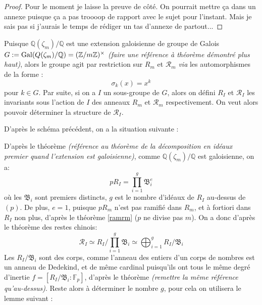 \documentclass[a4paper]{article} %
\numberwithin{equation}{section}
\newcommand\zmodn[1]{\mathbb{Z}/#1\mathbb{Z}}
\begin{document}
\begin{proof}
Pour le moment je laisse la preuve de côté. On pourrait mettre ça dans un annexe puisque ça a pas troooop de rapport avec le sujet pour l'instant. Mais je sais pas si j'aurais le temps de rédiger un tas d'annexe de partout...
\end{proof}

Puisque $\mathbb{Q}(\zeta_m)/\mathbb{Q}$ est une extension galoisienne de groupe de Galois $G := \textup{Gal}(Q(\zeta_m)/\mathbb{Q}) = (\zmodn{m})^{\times}$ \textit{(faire une référence à théorème démontré plus haut)}, alors le groupe agit par restriction sur $R_m$ et $\mathcal{R}_m$ \textit{via} les automorphismes de la forme :
\[\sigma_k(x) = x^k\]
pour $k\in G$. Par suite, si on a $I$ un sous-groupe de $G$, alors on défini $R_I$ et $\mathcal{R}_I$ les invariants sous l'action de $I$ des anneaux $R_m$ et $\mathcal{R}_m$ respectivement. On veut alors pouvoir déterminer la structure de $\mathcal{R}_I$.\par
D'après le schéma précédent, on a la situation suivante :

\begin{center}
\end{center}

D'après le théorème \textit{(référence au théorème de la décomposition en idéaux premier quand l'extension est galoisienne)}, comme $\mathbb{Q}(\zeta_m)/\mathbb{Q}$ est galoisienne, on a:
\[pR_I = \prod_{i = 1}^g{\mathfrak{B}_i^e}\]
où les $\mathfrak{B}_i$ sont premiers distincts, $g$ est le nombre d'idéaux de $R_I$ au-dessus de $(p)$. De plus, $e = 1$, puisque $pR_m$ n'est pas ramifié dans $R_m$, et à fortiori dans $R_I$ non plus, d'après le théorème \ref{ramrm} ($p$ ne divise pas $m$). On a donc d'après le théorème des restes chinois:
\[\mathcal{R}_I \simeq R_I/\prod_{i = 1}^g{\mathfrak{B}_i} \simeq \bigoplus_{i=1}^g{R_I/\mathfrak{B}_i}\]
Les $R_I/\mathfrak{B}_i$ sont des corps, comme l'anneau des entiers d'un corps de nombres est un anneau de Dedekind, et de même cardinal puisqu'ils ont tous le même degré d'inertie $f = [R_I/\mathfrak{B}_i:\mathbb{F}_p]$, d'après le théorème \textit{(remettre la même référence qu'au-dessus)}. Reste alors à déterminer le nombre $g$, pour cela on utilisera le lemme suivant :
\end{document}
